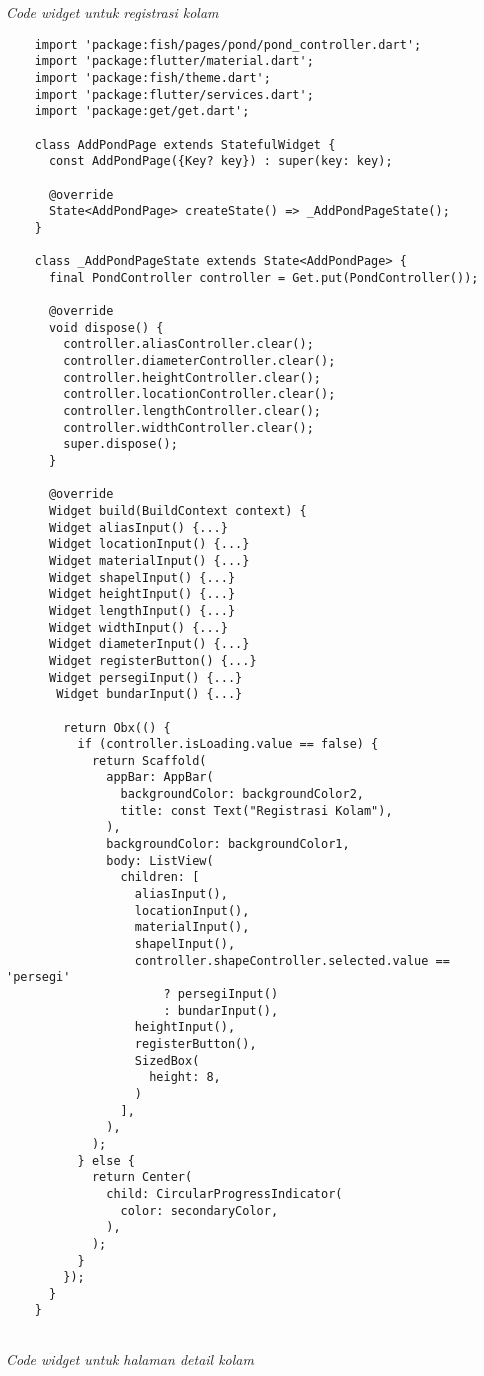 \textit{Code widget untuk registrasi kolam}
\begin{lstlisting}
	import 'package:fish/pages/pond/pond_controller.dart';
	import 'package:flutter/material.dart';
	import 'package:fish/theme.dart';
	import 'package:flutter/services.dart';
	import 'package:get/get.dart';
	
	class AddPondPage extends StatefulWidget {
	  const AddPondPage({Key? key}) : super(key: key);
	
	  @override
	  State<AddPondPage> createState() => _AddPondPageState();
	}
	
	class _AddPondPageState extends State<AddPondPage> {
	  final PondController controller = Get.put(PondController());
	
	  @override
	  void dispose() {
		controller.aliasController.clear();
		controller.diameterController.clear();
		controller.heightController.clear();
		controller.locationController.clear();
		controller.lengthController.clear();
		controller.widthController.clear();
		super.dispose();
	  }
	
	  @override
	  Widget build(BuildContext context) {
	  Widget aliasInput() {...}
	  Widget locationInput() {...}
	  Widget materialInput() {...}
	  Widget shapelInput() {...}
	  Widget heightInput() {...}
	  Widget lengthInput() {...}
	  Widget widthInput() {...}
	  Widget diameterInput() {...}
	  Widget registerButton() {...}
	  Widget persegiInput() {...}
	   Widget bundarInput() {...}
	
		return Obx(() {
		  if (controller.isLoading.value == false) {
			return Scaffold(
			  appBar: AppBar(
				backgroundColor: backgroundColor2,
				title: const Text("Registrasi Kolam"),
			  ),
			  backgroundColor: backgroundColor1,
			  body: ListView(
				children: [
				  aliasInput(),
				  locationInput(),
				  materialInput(),
				  shapelInput(),
				  controller.shapeController.selected.value == 'persegi'
					  ? persegiInput()
					  : bundarInput(),
				  heightInput(),
				  registerButton(),
				  SizedBox(
					height: 8,
				  )
				],
			  ),
			);
		  } else {
			return Center(
			  child: CircularProgressIndicator(
				color: secondaryColor,
			  ),
			);
		  }
		});
	  }
	}
	
\end{lstlisting}



\textit{Code widget untuk halaman detail kolam}

